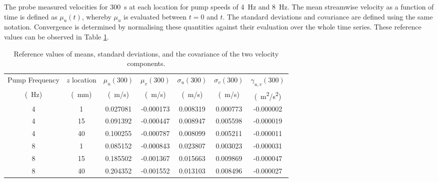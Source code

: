 \documentclass[12pt,oneside,a4paper]{article}
\begin{document}
 The probe measured velocities for \SI{300}{s} at each location for pump speeds of \SI{4}{Hz} and \SI{8}{Hz}. The mean streamwise velocity as a function of time is defined as $\mu_u (t)$, whereby $\mu_u$ is evaluated between $t=0$ and $t$. The standard deviations and covariance are defined using the same notation. Convergence is determined by normalising these quantities against their evaluation over the whole time series. These reference values can be observed in Table \ref{table:experiments:convergedStatistics}.
 \begin{table}[!b]
 \centering
 \caption{Reference values of means, standard deviations, and the covariance of the two velocity components.}
 \label{table:experiments:convergedStatistics}
 \begin{tabular}{c c c c c c c}
 \hline
 Pump Frequency	&	$z$ location	&	$\mu_u(300)$	&	$\mu_v(300)$	&	$\sigma_u(300)$	&	$\sigma_v(300)$	&	$\gamma_{u,v}(300)$	\\
 \multicolumn{1}{c}{(\SI{}{Hz})}	&	\multicolumn{1}{c}{(\SI{}{mm})}	&	\multicolumn{1}{c}{(\SI{}{m/s})}	&	\multicolumn{1}{c}{(\SI{}{m/s})}	&	\multicolumn{1}{c}{(\SI{}{m/s})}	& \multicolumn{1}{c}{(\SI{}{m/s})}	& \multicolumn{1}{c}{(\SI{}{m^2/s^2})}	\\
%
\hline
4	&	1	&	0.027081	&	-0.000173	&	0.008319	&	0.000773	&	-0.000002	\\
4	&	15	&	0.091392	&	-0.000447	&	0.008947	&	0.005598	&	-0.000019	\\
4	&	40	&	0.100255	&	-0.000787	&	0.008099	&	0.005211	&	-0.000011	\\
8	&	1	&	0.085152	&	-0.000843	&	0.023807	&	0.003023	&	-0.000031	\\
8	&	15	&	0.185502	&	-0.001367	&	0.015663	&	0.009869	&	-0.000047	\\
8	&	40	&	0.204352	&	-0.001552	&	0.013103	&	0.008496	&	-0.000027	\\
\hline
 
 \end{tabular}
 \end{table}
\end{document}
